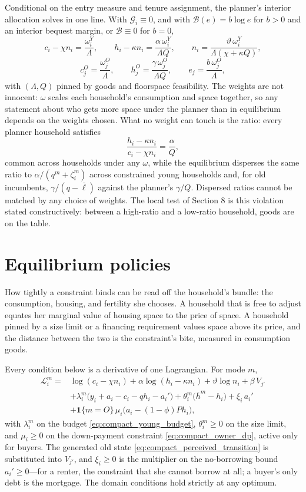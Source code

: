 \documentclass[11pt]{article}
\newcommand{\1}{\mathbf 1}
\begin{document}
Conditional on the entry measure and tenure assignment, the planner's interior allocation solves in one line. With $\mathcal G_i\equiv0$, and with $\mathcal B(e)=b\log e$ for $b>0$ and an interior bequest margin, or $\mathcal B\equiv0$ for $b=0$,
\[
c_i-\chi n_i=\frac{\omega_i^Y}{\Lambda},
\qquad
h_i-\kappa n_i=\frac{\alpha\,\omega_i^Y}{\Lambda Q},
\qquad
n_i=\frac{\vartheta\,\omega_i^Y}{\Lambda(\chi+\kappa Q)},
\]
\[
c_j^O=\frac{\omega_j^O}{\Lambda},
\qquad
h_j^O=\frac{\gamma\,\omega_j^O}{\Lambda Q},
\qquad
e_j=\frac{b\,\omega_j^O}{\Lambda},
\]
with $(\Lambda,Q)$ pinned by goods and floorspace feasibility. The weights are not innocent: $\omega$ scales each household's consumption and space together, so any statement about who gets more space under the planner than in equilibrium depends on the weights chosen. What no weight can touch is the ratio: every planner household satisfies
\[
\frac{h_i-\kappa n_i}{c_i-\chi n_i}=\frac{\alpha}{Q},
\]
common across households under any $\omega$, while the equilibrium disperses the same ratio to $\alpha/(q^m+\zeta_i^m)$ across constrained young households and, for old incumbents, $\gamma/(q-\bar\ell)$ against the planner's $\gamma/Q$. Dispersed ratios cannot be matched by any choice of weights. The local test of Section 8 is this violation stated constructively: between a high-ratio and a low-ratio household, goods are on the table.

\section{Equilibrium policies}

How tightly a constraint binds can be read off the household's bundle: the consumption, housing, and fertility she chooses. A household that is free to adjust equates her marginal value of housing space to the price of space. A household pinned by a size limit or a financing requirement values space above its price, and the distance between the two is the constraint's bite, measured in consumption goods.

Every condition below is a derivative of one Lagrangian. For mode $m$,
\begin{align*}
\mathcal L_i^m
={}&\log(c_i-\chi n_i)+\alpha\log(h_i-\kappa n_i)+\vartheta\log n_i
+\beta\,V_{j'}\\
&+\lambda_i^m\big(y_i+a_i-c_i-q h_i-a_i'\big)
+\theta_i^m\big(\bar h^m-h_i\big)
+\xi_i\,a_i'\\
&+\1\{m=O\}\,\mu_i\big(a_i-(1-\phi)P h_i\big),
\end{align*}
with $\lambda_i^m$ on the budget \eqref{eq:compact_young_budget}, $\theta_i^m\ge0$ on the size limit, and $\mu_i\ge0$ on the down-payment constraint \eqref{eq:compact_owner_dp}, active only for buyers. The generated old state \eqref{eq:compact_perceived_transition} is substituted into $V_{j'}$, and $\xi_i\ge0$ is the multiplier on the no-borrowing bound $a_i'\ge0$---for a renter, the constraint that she cannot borrow at all; a buyer's only debt is the mortgage. The domain conditions hold strictly at any optimum.
\end{document}
